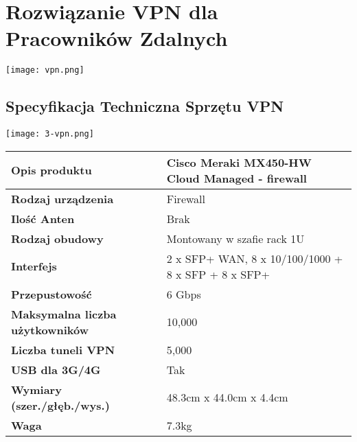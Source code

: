 \section{Rozwiązanie VPN dla Pracowników Zdalnych}
\texttt{[image: vpn.png]}

\subsection{Specyfikacja Techniczna Sprzętu VPN}

    \texttt{[image: 3-vpn.png]}

    \begin{flushleft}
        \begin{table}[h]
            \renewcommand{\arraystretch}{1.5}
            \begin{tabular}{|l|l|}
                \hline
                \textbf{Opis produktu} & Cisco Meraki MX450-HW Cloud Managed - firewall \\
                \hline
                \textbf{Rodzaj urządzenia} & Firewall \\
                \hline
                \textbf{Ilość Anten} & Brak \\
                \hline
                \textbf{Rodzaj obudowy} & Montowany w szafie rack 1U \\
                \hline
                \textbf{Interfejs} & 2 x SFP+ WAN, 8 x 10/100/1000 + 8 x SFP + 8 x SFP+ \\
                \hline
                \textbf{Przepustowość} & 6 Gbps \\
                \hline
                \textbf{Maksymalna liczba użytkowników} & 10,000 \\
                \hline
                \textbf{Liczba tuneli VPN} & 5,000 \\
                \hline
                \textbf{USB dla 3G/4G} & Tak \\
                \hline
                \textbf{Wymiary (szer./głęb./wys.)} & 48.3cm x 44.0cm x 4.4cm \\
                \hline
                \textbf{Waga} & 7.3kg \\
                \hline
            \end{tabular}
        \end{table}
    \end{flushleft}
